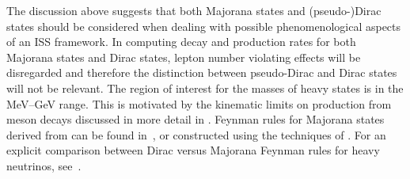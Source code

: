 The discussion above suggests that both Majorana states and \mbox{(pseudo-)Dirac} states should be considered %
when dealing with possible phenomenological aspects of an ISS framework.
In computing decay and production rates for both Majorana states and Dirac states, %
lepton number violating effects will be disregarded and therefore the distinction between pseudo-Dirac %
and Dirac states will not be relevant.
The region of interest for the masses of heavy states is in the MeV--GeV range.
This is motivated by the kinematic limits on production from meson decays discussed in more detail in . %
Feynman rules for Majorana states derived from  can be found in~\cite{Atre:2009rg},
or constructed using the techniques of . 
For an explicit comparison between Dirac versus Majorana Feynman rules for heavy neutrinos, see~.




